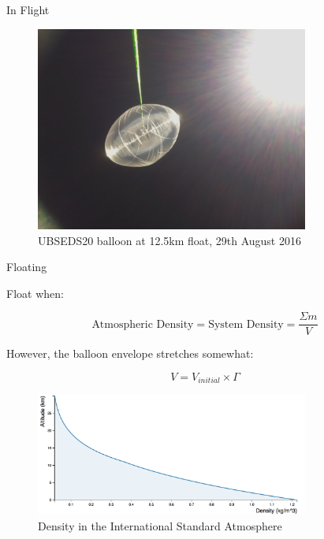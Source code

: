 \documentclass{beamer}
\begin{document}
\begin{frame}{In Flight}

  \begin{figure}[!ht]
    \centering
    \includegraphics[width=0.8\textwidth]{UBSEDL_2016-08-29T10-24-37_3.png}
    \caption{UBSEDS20 balloon at 12.5km float, 29th August 2016}
  \end{figure}


\end{frame}
\begin{frame}{Floating}


  Float when:

  \[
    \text{Atmospheric Density} = \text{System Density} = {\frac{\Sigma{m}}{V}}
  \]


  However, the balloon envelope stretches somewhat:

  \[
    V = V_{initial}\times\Gamma
  \]


  \begin{figure}[!ht]
    \centering
    \includegraphics[width=0.8\textwidth]{isa_density_profile.png}
    \caption{Density in the International Standard Atmosphere}
  \end{figure}


\end{frame}
\end{document}
